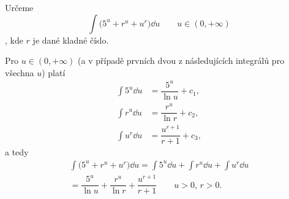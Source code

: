 \begin{mdframed}[style=mdexam]
  \begin{example}\label{MAI:exam145}
    Určeme \[\int\bigl(5^u + r^u + u^r\bigr)\dd{u}\qquad u\in(0, +\infty)\], kde \(r\) je dané
    kladné číslo. 
    
    Pro \(u\in(0, +\infty)\) (a v případě prvních dvou z následujících integrálů pro všechna \(u\))
    platí
    \begin{align*}
      \int 5^u\dd{u}  &= \dfrac{5^u}{\ln u}   + c_1,  \\
      \int r^u\dd{u}  &= \dfrac{r^u}{\ln r}   + c_2,  \\
      \int u^r\dd{u}  &= \dfrac{u^{r+1}}{r+1} + c_3,
    \end{align*}  
    a tedy
    \begin{multline*}
      \int\bigl(5^u + r^u + u^r\bigr)\dd{u} = \int 5^u\dd{u}+\int r^u\dd{u}+\int u^r\dd{u}        \\
          =\dfrac{5^u}{\ln u} + \dfrac{r^u}{\ln r} + \dfrac{u^{r+1}}{r+1}\qquad u>0, \, r>0. 
    \end{multline*}
  \end{example}
\end{mdframed}